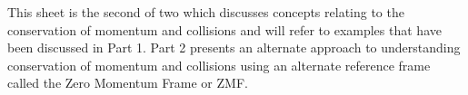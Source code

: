 



\addtolength{\topmargin}{-0.7 cm}
\setlength{\columnsep}{22pt}
\nll
This sheet is the second of two which discusses concepts relating to the conservation of momentum and collisions and will refer to examples that have been discussed in Part 1.  Part 2 presents an alternate approach to understanding conservation of momentum and collisions using an alternate reference frame called the Zero Momentum Frame or ZMF.
